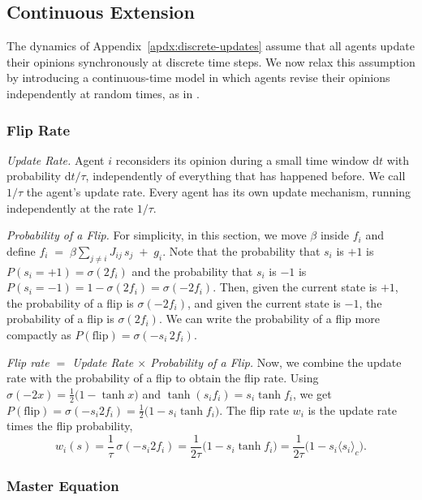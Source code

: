 \subsection{Continuous Extension}\label{apdx:continuous-extension}

The dynamics of Appendix~\ref{apdx:discrete-updates} assume that all agents update their
opinions synchronously at discrete time steps. We now relax this assumption by introducing a
continuous-time model in which agents revise their opinions independently at random times, as in \citet{glauber1963}.

\subsubsection{Flip Rate}

\textit{Update Rate.} Agent $i$ reconsiders its opinion during a small time window $\mathrm dt$
with probability $\mathrm dt/\tau$, independently of everything that has happened before. We call $1/\tau$ the agent's update rate. Every agent has its own update mechanism, running independently at the rate $1/\tau$.

\textit{Probability of a Flip.} For simplicity, in this section, we move $\beta$ inside $f_i$ and define $f_i \;=\; \beta  \sum_{j\neq i} J_{ij}\,s_j \;+\; g_i$. Note that the probability that $s_i$ is $+1$ is $P(s_i = +1) = \sigma(2f_i)$ and the
probability that $s_i$ is $-1$ is $P(s_i = -1) = 1 - \sigma(2f_i) = \sigma(-2f_i)$. Then, given
the current state is $+1$, the probability of a flip is $\sigma(-2f_i)$, and given the current
state is $-1$, the probability of a flip is $\sigma(2f_i)$. We can write the probability of a
flip more compactly as
\(
P(\text{flip}) = \sigma(-s_i\,2f_i)
\).

\textit{Flip rate $=$ Update Rate $\times$ Probability of a Flip.} Now, we combine the update
rate with the probability of a flip to obtain the flip rate. Using
$\sigma(-2x) = \tfrac{1}{2}\big(1 - \tanh x\big)$ and $\tanh(s_i f_i) = s_i \tanh f_i$, we get
\(
P(\text{flip}) = \sigma(-s_i 2f_i) = \tfrac{1}{2}\big(1 - s_i \tanh f_i\big).
\) The flip rate $w_i$ is the update rate times the flip probability,
\[
w_i(s) = \frac{1}{\tau}\,\sigma(-s_i 2f_i)
= \frac{1}{2\tau}\big(1 - s_i \tanh f_i\big)
= \frac{1}{2\tau}\big(1 - s_i \langle s_i\rangle_c\big).
\]

\subsubsection{Master Equation}

